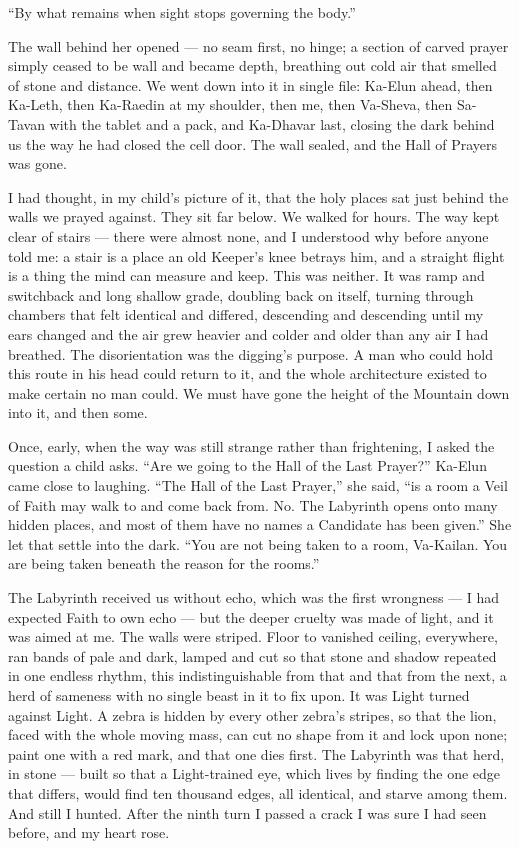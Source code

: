 ``By what remains when sight stops governing the body.''\par
 
The wall behind her opened --- no seam first, no hinge; a section of carved prayer simply ceased to be wall and became depth, breathing out cold air that smelled of stone and distance. We went down into it in single file: Ka-Elun ahead, then Ka-Leth, then Ka-Raedin at my shoulder, then me, then Va-Sheva, then Sa-Tavan with the tablet and a pack, and Ka-Dhavar last, closing the dark behind us the way he had closed the cell door. The wall sealed, and the Hall of Prayers was gone.\par
 
I had thought, in my child's picture of it, that the holy places sat just behind the walls we prayed against. They sit far below. We walked for hours. The way kept clear of stairs --- there were almost none, and I understood why before anyone told me: a stair is a place an old Keeper's knee betrays him, and a straight flight is a thing the mind can measure and keep. This was neither. It was ramp and switchback and long shallow grade, doubling back on itself, turning through chambers that felt identical and differed, descending and descending until my ears changed and the air grew heavier and colder and older than any air I had breathed. The disorientation was the digging's purpose. A man who could hold this route in his head could return to it, and the whole architecture existed to make certain no man could. We must have gone the height of the Mountain down into it, and then some.\par
 
Once, early, when the way was still strange rather than frightening, I asked the question a child asks. ``Are we going to the Hall of the Last Prayer?'' Ka-Elun came close to laughing. ``The Hall of the Last Prayer,'' she said, ``is a room a Veil of Faith may walk to and come back from. No. The Labyrinth opens onto many hidden places, and most of them have no names a Candidate has been given.'' She let that settle into the dark. ``You are not being taken to a room, Va-Kailan. You are being taken beneath the reason for the rooms.''\par
 
The Labyrinth received us without echo, which was the first wrongness --- I had expected Faith to own echo --- but the deeper cruelty was made of light, and it was aimed at me. The walls were striped. Floor to vanished ceiling, everywhere, ran bands of pale and dark, lamped and cut so that stone and shadow repeated in one endless rhythm, this indistinguishable from that and that from the next, a herd of sameness with no single beast in it to fix upon. It was Light turned against Light. A zebra is hidden by every other zebra's stripes, so that the lion, faced with the whole moving mass, can cut no shape from it and lock upon none; paint one with a red mark, and that one dies first. The Labyrinth was that herd, in stone --- built so that a Light-trained eye, which lives by finding the one edge that differs, would find ten thousand edges, all identical, and starve among them. And still I hunted. After the ninth turn I passed a crack I was sure I had seen before, and my heart rose.\par
 
